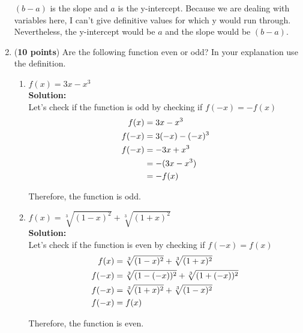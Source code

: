 \documentclass[a4paper]{article}
\begin{document}
\begin{enumerate}
$(b-a)$ is the slope and $a$ is the y-intercept. Because we are dealing with variables here, I can't give definitive values for which y would run through. Nevertheless, the y-intercept would be $a$ and the slope would be $(b-a)$.


\item (\textbf{10 points}) Are the following function even or odd? In your explanation use the definition.\\




\begin{enumerate}
	\item $f(x) = 3x - x^3$\\
	\textbf{Solution:}\\
	
	Let's check if the function is odd by checking if $f(-x) = -f(x)$\\
	\begin{align}
		f(x) &= 3x - x^3 \notag\\
		f(-x) &= 3(-x) - (-x)^3 \notag\\
		f(-x) &= -3x + x^3 \notag\\
		&= -(3x - x^3) \notag\\
		&= -f(x) \notag
	\end{align}
	
	Therefore, the function is odd.
	\item $f(x) = \sqrt[3]{(1-x)^2} + \sqrt[3]{(1+x)^2}$\\
	\textbf{Solution:}\\
	
	Let's check if the function is even by checking if $f(-x) = f(x)$\\
	\begin{align}
		f(x) &= \sqrt[3]{(1-x)^2} + \sqrt[3]{(1+x)^2} \notag\\
		f(-x) &= \sqrt[3]{(1 - (-x))^2} + \sqrt[3]{(1 + (-x))^2} \notag\\
		f(-x) &= \sqrt[3]{(1 + x)^2} + \sqrt[3]{(1 - x)^2} \notag\\
		f(-x) &= f(x) \notag
	\end{align}	
	
	
	Therefore, the function is even.
\end{enumerate}



\end{enumerate}
\end{document}
